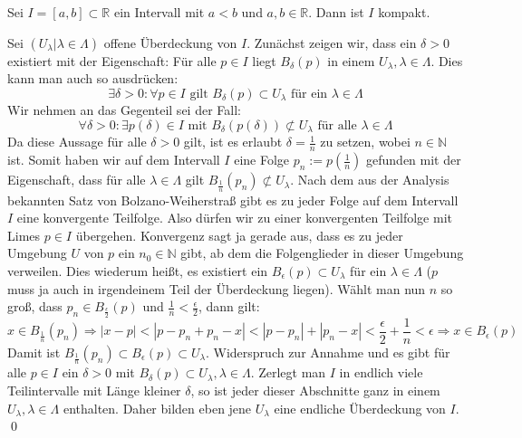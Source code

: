 \begin{Satz}
	Sei \(I = [ a , b ] \subset \mathbb{R}\) ein Intervall mit \(a<b\) und \(a,b \in \mathbb{R}\). Dann 
	ist \(I\) kompakt.
\end{Satz}
	Sei \( (U_{\lambda} | \lambda \in \Lambda) \) offene Überdeckung von \(I\). Zunächst zeigen wir,
	dass ein \(\delta > 0\) existiert mit der Eigenschaft: Für alle \(p \in I\) liegt \(B_{\delta}(p)\)
	in einem \(U_{\lambda}, \lambda \in \Lambda\). Dies kann man auch so ausdrücken: 
	\[ \exists \delta > 0 : \forall p \in I \mbox{ gilt } B_{\delta}(p) \subset U_{\lambda} \mbox { für ein } \lambda \in \Lambda \]
	Wir nehmen an das Gegenteil sei der Fall:
	\[ \forall \delta > 0 : \exists p(\delta) \in I \mbox{ mit } B_{\delta}(p(\delta)) \not\subset U_{\lambda} \mbox { für alle } \lambda \in \Lambda \]
	Da diese Aussage für alle \(\delta > 0\) gilt, ist es erlaubt \(\delta = \frac{1}{n}\) zu setzen, wobei \(n \in \mathbb{N}\) ist.
	Somit haben wir auf dem Intervall \(I\) eine Folge \(p_{n} := p(\frac{1}{n})\) gefunden mit der Eigenschaft, dass für alle \(\lambda \in \Lambda\)
	gilt \(B_{\frac{1}{n}}(p_{n}) \not\subset U_{\lambda}\). Nach dem aus der Analysis bekannten Satz von Bolzano-Weiherstraß gibt
	es zu jeder Folge auf dem Intervall \(I\) eine konvergente Teilfolge. Also dürfen wir zu einer konvergenten Teilfolge mit Limes \(p \in I\) übergehen.
  Konvergenz sagt ja gerade aus, dass es zu jeder Umgebung \(U\) von \(p\) ein \(n_0 \in \mathbb{N}\) gibt, 
	ab dem die Folgenglieder in dieser Umgebung verweilen. Dies wiederum heißt, es existiert ein \(B_{\epsilon}(p) \subset U_{\lambda}\) für ein \(\lambda \in \Lambda\)
	(\(p\) muss ja auch in irgendeinem Teil der Überdeckung liegen). Wählt man nun \(n\) so groß, dass \(p_n \in B_{\frac{\epsilon}{2}}(p)\) und \(\frac{1}{n} < \frac{\epsilon}{2}\),
	dann gilt:
	\[ x \in B_{\frac{1}{n}}(p_n) \Rightarrow |x-p| < |p-p_n+p_n-x| < |p-p_n| + |p_n-x| < \frac{\epsilon}{2} + \frac{1}{n} < \epsilon \Rightarrow x \in B_{\epsilon}(p) \]
	Damit ist \(B_{\frac{1}{n}}(p_n) \subset B_{\epsilon}(p) \subset U_{\lambda}\).
	Widerspruch zur Annahme und es gibt für alle \(p \in I\) ein \(\delta > 0\) mit \(B_{\delta}(p) \subset U_{\lambda}, \lambda \in \Lambda\).
	Zerlegt man \(I\) in endlich viele Teilintervalle mit Länge kleiner \(\delta\), so ist jeder dieser Abschnitte ganz in einem \(U_{\lambda}, \lambda \in \Lambda\)
	enthalten. Daher bilden eben jene \(U_{\lambda}\) eine endliche Überdeckung von \(I\).
\qed

